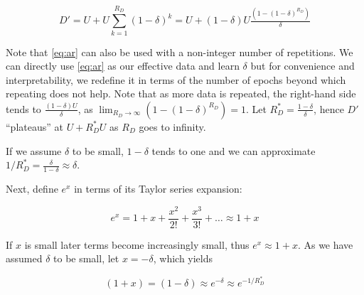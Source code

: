 \documentclass{article}
\begin{document}
\begin{equation}\label{eq:ar}
D' = U + U\sum_{k=1}^{R_D} (1-\delta)^k = U + (1-\delta)U\tfrac{(1-(1-\delta)^{R_D})}{\delta}
\end{equation}

Note that \autoref{eq:ar} can also be used with a non-integer number of repetitions. We can directly use \autoref{eq:ar} as our effective data and learn $\delta$ but for convenience and interpretability, we redefine it in terms of the number of epochs beyond which repeating does not help. Note that as more data is repeated, the right-hand side tends to $\tfrac{(1-\delta)U}{\delta}$, as $\lim_{R_D\to\infty}(1 - (1-\delta)^{R_D}) = 1$. Let $R^*_D = \tfrac{1-\delta}{\delta}$, hence $D'$ ``plateaus'' at $U + R^*_D U$ as $R_D$ goes to infinity.


If we assume $\delta$ to be small, ${1-\delta}$ tends to one and we can approximate $1/R^*_D = \tfrac{\delta}{1-\delta} \approx \delta$.


Next, define $e^x$ in terms of its Taylor series expansion:

\begin{equation}\label{eq:approx2}
e^x = 1 + x + \frac{x^2}{2!} + \frac{x^3}{3!} + \dots \approx 1 + x
\end{equation}

If $x$ is small later terms become increasingly small, thus $e^x \approx 1 + x$. As we have assumed $\delta$ to be small, let $x = -\delta$, which yields 

\begin{equation}\label{eq:approx3}
(1 + x) = (1 - \delta) \approx e^{-\delta} \approx e^{-1/R^*_D}
\end{equation}
\end{document}
